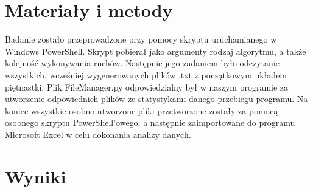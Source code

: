 \documentclass{classrep}
\begin{document}
\section{Materiały i metody}
{
Badanie zostało przeprowadzone przy pomocy skryptu uruchamianego w Windows PowerShell. Skrypt pobierał jako argumenty rodzaj algorytmu, a także kolejność wykonywania ruchów.
Następnie jego zadaniem było odczytanie wszystkich, wcześniej wygenerowanych plików .txt z początkowym układem piętnastki. Plik FileManager.py odpowiedzialny był w naszym programie za utworzenie odpowiednich plików ze statystykami danego przebiegu programu. Na koniec wszystkie osobno utworzone pliki przetworzone zostały za pomocą osobnego skryptu PowerShell'owego, a następnie zaimportowane do programu Microsoft Excel w celu dokonania analizy danych.
}

\section{Wyniki}
\end{document}
